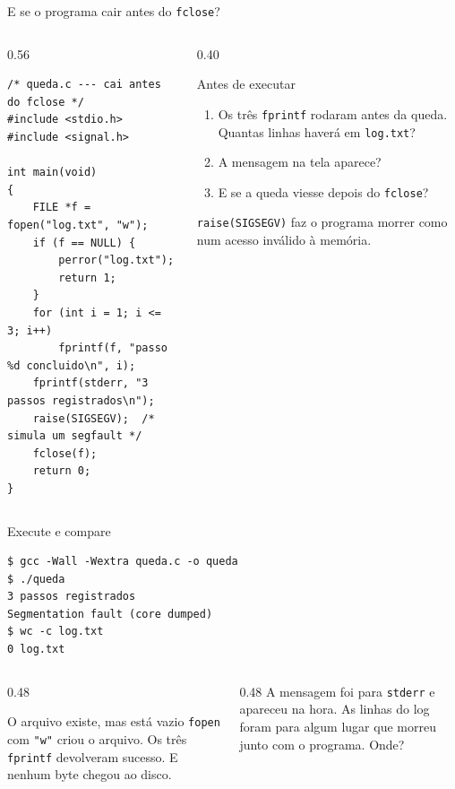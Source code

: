 \documentclass[aspectratio=169]{beamer}
\begin{document}
\begin{frame}[fragile]{E se o programa cair antes do \texttt{fclose}?}
  \vspace{-0.6em}
  \begin{columns}[T]
    \begin{column}{0.56\textwidth}
\begin{lstlisting}[style=codCs]
/* queda.c --- cai antes do fclose */
#include <stdio.h>
#include <signal.h>

int main(void)
{
    FILE *f = fopen("log.txt", "w");
    if (f == NULL) {
        perror("log.txt");
        return 1;
    }
    for (int i = 1; i <= 3; i++)
        fprintf(f, "passo %d concluido\n", i);
    fprintf(stderr, "3 passos registrados\n");
    raise(SIGSEGV);  /* simula um segfault */
    fclose(f);
    return 0;
}
\end{lstlisting}
    \end{column}
    \begin{column}{0.40\textwidth}
      \begin{block}{Antes de executar}
        \small
        \begin{enumerate}
          \item Os três \texttt{fprintf} rodaram antes da queda. Quantas
            linhas haverá em \texttt{log.txt}?
          \item A mensagem na tela aparece?
          \item E se a queda viesse depois do \texttt{fclose}?
        \end{enumerate}
      \end{block}
      \small \texttt{raise(SIGSEGV)} faz o programa morrer como num acesso
      inválido à memória.
    \end{column}
  \end{columns}
\end{frame}

\begin{frame}[fragile]{Execute e compare}
\begin{lstlisting}[style=shellStyle]
$ gcc -Wall -Wextra queda.c -o queda
$ ./queda
3 passos registrados
Segmentation fault (core dumped)
$ wc -c log.txt
0 log.txt
\end{lstlisting}
  \begin{columns}[T]
    \begin{column}{0.48\textwidth}
      \begin{block}{O arquivo existe, mas está vazio}
        \small \texttt{fopen} com \texttt{"w"} criou o arquivo. Os três
        \texttt{fprintf} devolveram sucesso. E nenhum byte chegou ao disco.
      \end{block}
    \end{column}
    \begin{column}{0.48\textwidth}
      \small A mensagem foi para \texttt{stderr} e apareceu na hora. As
      linhas do log foram para algum lugar que morreu junto com o programa.
      Onde?
    \end{column}
  \end{columns}
\end{frame}
\end{document}
